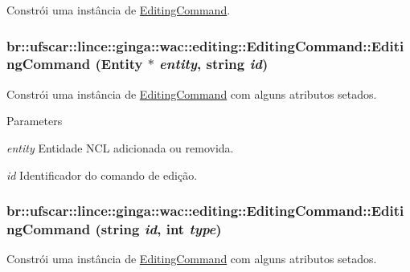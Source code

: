 Constrói uma instância de \hyperlink{classbr_1_1ufscar_1_1lince_1_1ginga_1_1wac_1_1editing_1_1EditingCommand}{EditingCommand}. 

\hypertarget{classbr_1_1ufscar_1_1lince_1_1ginga_1_1wac_1_1editing_1_1EditingCommand_a394301f565410f3142aab8aed54dec76}{
\subsubsection[{EditingCommand}]{\setlength{\rightskip}{0pt plus 5cm}br::ufscar::lince::ginga::wac::editing::EditingCommand::EditingCommand (Entity $\ast$ {\em entity}, \/  string {\em id})}}
\label{classbr_1_1ufscar_1_1lince_1_1ginga_1_1wac_1_1editing_1_1EditingCommand_a394301f565410f3142aab8aed54dec76}


Constrói uma instância de \hyperlink{classbr_1_1ufscar_1_1lince_1_1ginga_1_1wac_1_1editing_1_1EditingCommand}{EditingCommand} com alguns atributos setados. 


\begin{DoxyParams}{Parameters}
\item[{\em entity}]Entidade NCL adicionada ou removida. \item[{\em id}]Identificador do comando de edição. \end{DoxyParams}
\hypertarget{classbr_1_1ufscar_1_1lince_1_1ginga_1_1wac_1_1editing_1_1EditingCommand_aed488bae30632bb228aa299e82549da9}{
\subsubsection[{EditingCommand}]{\setlength{\rightskip}{0pt plus 5cm}br::ufscar::lince::ginga::wac::editing::EditingCommand::EditingCommand (string {\em id}, \/  int {\em type})}}
\label{classbr_1_1ufscar_1_1lince_1_1ginga_1_1wac_1_1editing_1_1EditingCommand_aed488bae30632bb228aa299e82549da9}


Constrói uma instância de \hyperlink{classbr_1_1ufscar_1_1lince_1_1ginga_1_1wac_1_1editing_1_1EditingCommand}{EditingCommand} com alguns atributos setados. 



